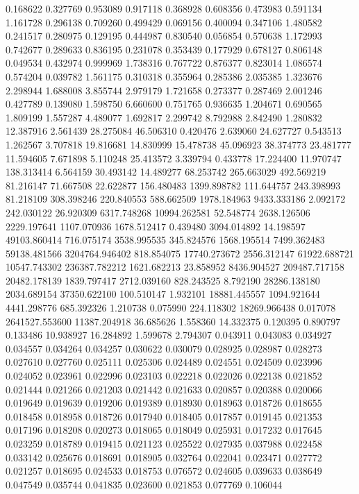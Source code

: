 0.168622
0.327769
0.953089
0.917118
0.368928
0.608356
0.473983
0.591134
1.161728
0.296138
0.709260
0.499429
0.069156
0.400094
0.347106
1.480582
0.241517
0.280975
0.129195
0.444987
0.830540
0.056854
0.570638
1.172993
0.742677
0.289633
0.836195
0.231078
0.353439
0.177929
0.678127
0.806148
0.049534
0.432974
0.999969
1.738316
0.767722
0.876377
0.823014
1.086574
0.574204
0.039782
1.561175
0.310318
0.355964
0.285386
2.035385
1.323676
2.298944
1.688008
3.855744
2.979179
1.721658
0.273377
0.287469
2.001246
0.427789
0.139080
1.598750
6.660600
0.751765
0.936635
1.204671
0.690565
1.809199
1.557287
4.489077
1.692817
2.299742
8.792988
2.842490
1.280832
12.387916
2.561439
28.275084
46.506310
0.420476
2.639060
24.627727
0.543513
1.262567
3.707818
19.816681
14.830999
15.478738
45.096923
38.374773
23.481777
11.594605
7.671898
5.110248
25.413572
3.339794
0.433778
17.224400
11.970747
138.313414
6.564159
30.493142
14.489277
68.253742
265.663029
492.569219
81.216147
71.667508
22.622877
156.480483
1399.898782
111.644757
243.398993
81.218109
308.398246
220.840553
588.662509
1978.184963
9433.333186
2.092172
242.030122
26.920309
6317.748268
10994.262581
52.548774
2638.126506
2229.197641
1107.070936
1678.512417
0.439480
3094.014892
14.198597
49103.860414
716.075174
3538.995535
345.824576
1568.195514
7499.362483
59138.481566
3204764.946402
818.854075
17740.273672
2556.312147
61922.688721
10547.743302
236387.782212
1621.682213
23.858952
8436.904527
209487.717158
20482.178139
1839.797417
2712.039160
828.243525
8.792190
28286.138180
2034.689154
37350.622100
100.510147
1.932101
18881.445557
1094.921644
4441.298776
685.392326
1.210738
0.075990
224.118302
18269.966438
0.017078
2641527.553600
11387.204918
36.685626
1.558360
14.332375
0.120395
0.890797
0.133486
10.938927
16.284892
1.599678
2.794307
0.043911
0.043083
0.034927
0.034557
0.034264
0.034257
0.030622
0.030079
0.028925
0.028987
0.028273
0.027610
0.027760
0.025111
0.025306
0.024489
0.024551
0.024509
0.023996
0.024052
0.023961
0.022996
0.023103
0.022218
0.022026
0.022138
0.021852
0.021444
0.021266
0.021203
0.021442
0.021633
0.020857
0.020388
0.020066
0.019649
0.019639
0.019206
0.019389
0.018930
0.018963
0.018726
0.018655
0.018458
0.018958
0.018726
0.017940
0.018405
0.017857
0.019145
0.021353
0.017196
0.018208
0.020273
0.018065
0.018049
0.025931
0.017232
0.017645
0.023259
0.018789
0.019415
0.021123
0.025522
0.027935
0.037988
0.022458
0.033142
0.025676
0.018691
0.018905
0.032764
0.022041
0.023471
0.027772
0.021257
0.018695
0.024533
0.018753
0.076572
0.024605
0.039633
0.038649
0.047549
0.035744
0.041835
0.023600
0.021853
0.077769
0.106044
